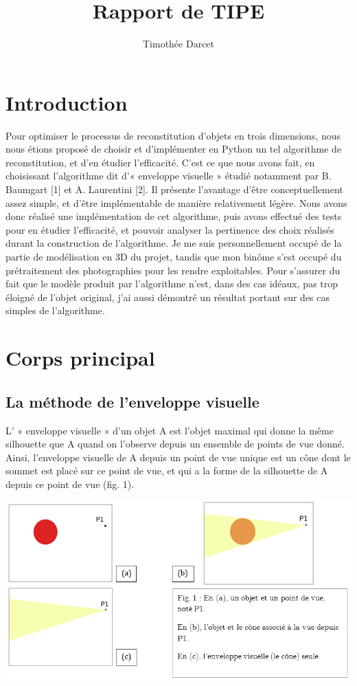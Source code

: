 \documentclass[a4paper]{article}
\title{Rapport de TIPE}
\author{Timothée Darcet}
\begin{document}
  \maketitle

  \pagebreak

  \section{Introduction}
    Pour optimiser le processus de reconstitution d’objets en trois dimensions, nous nous étions proposé de choisir et d’implémenter en Python un tel algorithme de reconstitution, et d’en étudier l’efficacité. C’est ce que nous avons fait, en choisissant l’algorithme dit d’« enveloppe visuelle » étudié notamment par B. Baumgart [1] et A. Laurentini [2]. Il présente l’avantage d’être conceptuellement assez simple, et d’être implémentable de{} manière relativement légère.
    Nous avons donc réalisé une implémentation de cet algorithme, puis avons effectué des tests pour en étudier l’efficacité, et pouvoir analyser la pertinence des choix réalisés durant la construction de l’algorithme. Je me suis personnellement occupé de la partie de modélisation en 3D du projet, tandis que mon binôme s’est occupé du prétraitement des photographies pour les rendre exploitables. Pour s’assurer du fait que le modèle produit par l’algorithme n’est, dans des cas idéaux, pas trop éloigné de l’objet original, j’ai aussi démontré un résultat portant sur des cas simples de l’algorithme. 
  \section{Corps principal}
    \subsection{La méthode de l'enveloppe visuelle}
      L’ « enveloppe visuelle » d’un objet A est l’objet maximal qui donne la même silhouette que A quand on l’observe depuis un ensemble de points de vue donné. Ainsi, l’enveloppe visuelle de A depuis un point de vue unique est un cône dont le sommet est placé sur ce point de vue, et qui a la forme de la silhouette de A depuis ce point de vue (fig. 1).

      \includegraphics[width=\textwidth]{ScreenSchema1}      
\end{document}
